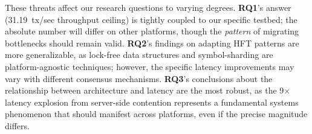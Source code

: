 These threats affect our research questions to varying degrees. \textbf{RQ1}'s answer (31.19~tx/sec throughput ceiling) is tightly coupled to our specific testbed; the absolute number will differ on other platforms, though the \textit{pattern} of migrating bottlenecks should remain valid. \textbf{RQ2}'s findings on adapting HFT patterns are more generalizable, as lock-free data structures and symbol-sharding are platform-agnostic techniques; however, the specific latency improvements may vary with different consensus mechanisms. \textbf{RQ3}'s conclusions about the relationship between architecture and latency are the most robust, as the 9$\times$ latency explosion from server-side contention represents a fundamental systems phenomenon that should manifest across platforms, even if the precise magnitude differs.

